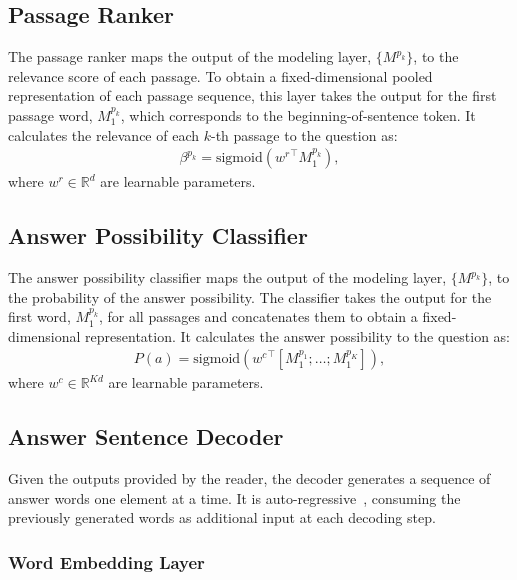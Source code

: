 \documentclass[11pt,a4paper]{article}
\theoremstyle{mydef}
\theoremstyle{myprob}
\begin{document}
\subsection{Passage Ranker}
\label{sec:ranker}

The passage ranker maps the output of the modeling layer,  $\{M^{p_k}\}$, to the relevance score of each passage. To obtain a fixed-dimensional pooled representation of each passage sequence, this layer takes the output for the first passage word, $M^{p_k}_1$, which corresponds to the beginning-of-sentence token. It calculates the relevance of each $k$-th passage to the question as:
\begin{align}
\beta^{p_k} = \mathrm{sigmoid}({w^r}^\top M^{p_k}_1),
\end{align}
where $w^r \in \mathbb{R}^{d}$ are learnable parameters.

\subsection{Answer Possibility Classifier}
\label{sec:classifier}

The answer possibility classifier maps the output of the modeling layer,  $\{M^{p_k}\}$,  to the probability of the answer possibility. The classifier takes the output for the first word, $M^{p_k}_1$, for all passages and concatenates them to obtain a fixed-dimensional representation.  It calculates the answer possibility to the question as:
\begin{align}
P(a) = \mathrm{sigmoid}({w^c}^\top [M^{p_1}_1; \ldots; M^{p_K}_1]),
\end{align}
where $w^c \in \mathbb{R}^{Kd}$ are learnable parameters.

\subsection{Answer Sentence Decoder}
\label{sec:decoder}

Given the outputs 
provided by the reader, 
the decoder generates a sequence of answer words one element at a time. It is auto-regressive~\citep{Graves13}, consuming the previously generated words as additional input at each decoding step.

\subsubsection{Word Embedding Layer}
\end{document}
